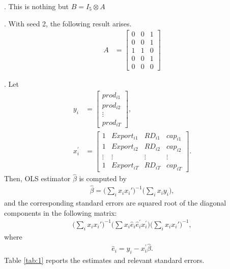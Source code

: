 \documentclass[11pt, letterpaper]{article}
\begin{document}
. This is nothing but $B = I_{5} \otimes A$

. With seed 2, the following result arises. 
\begin{align}
A & = \begin{bmatrix}
          0 & 0 & 1 \\
          0 & 0 & 1 \\
          1 & 1 & 0 \\
          0 & 0 & 1 \\
          0 & 0 & 0 
       \end{bmatrix} \nonumber
\end{align} 

. Let
\begin{align}
y_{i}& = \begin{bmatrix}
           prod_{i1} \\
           prod_{i2} \\
           \vdots    \\
           prod_{iT}
         \end{bmatrix}, \nonumber \\          
x_{i}^{'}& = \begin{bmatrix}
           1 & Export_{i1} & RD_{i1} & cap_{i1} \\
           1 & Export_{i2} & RD_{i2} & cap_{i2} \\
           \vdots &  \vdots & \vdots & \vdots   \\
           1 & Export_{iT} & RD_{iT} & cap_{iT}
          \end{bmatrix}. \nonumber 
\end{align}
Then, OLS estimator $\hat{\beta}$ is computed by 
\begin{align}
\hat{\beta} = \big( \sum_{i} x_{i} x_{i}' \big)^{-1} \big( \sum_{i} x_{i} y_{i} \big), \nonumber
\end{align}
and the corresponding standard errors are squared root of the diagonal components in the following matrix:
\begin{align}
\big( \sum_{i} x_{i} x_{i}' \big)^{-1} \big( \sum x_{i}\hat{e}_{i}\hat{e}_{i}^{'}x_{i}^{'} \big) \big( \sum_{i} x_{i} x_{i}' \big)^{-1}, \nonumber
\end{align}
where
\begin{align}
\hat{e}_{i} = y_{i} - x_{i}^{'}\hat{\beta}. \nonumber
\end{align}
Table \ref{tab:1} reports the estimates and relevant standard errors.
\end{document}
